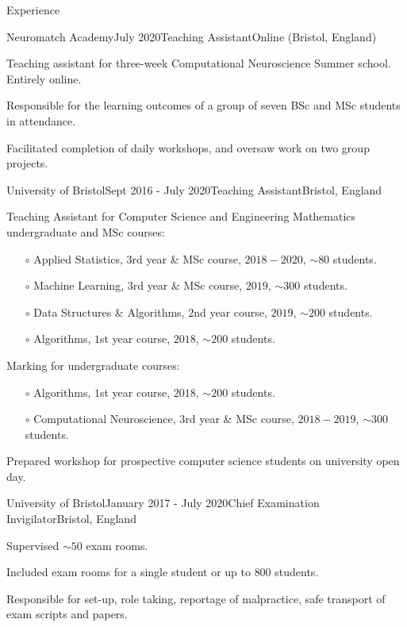 \documentclass{resume} %
\begin{document}
\begin{rSection}{Experience}

  \begin{rSubsection}{Neuromatch Academy}{July 2020}{Teaching Assistant}{Online (Bristol, England)}
    \item Teaching assistant for three-week Computational Neuroscience Summer school. Entirely online.
    \item Responsible for the learning outcomes of a group of seven BSc and MSc students in attendance.
    \item Facilitated completion of daily workshops, and oversaw work on two group projects.
  \end{rSubsection}

  \begin{rSubsection}{University of Bristol}{Sept 2016 - July 2020}{Teaching Assistant}{Bristol, England}
    \item Teaching Assistant for Computer Science and Engineering Mathematics undergraduate and MSc courses:
      \begin{itemize}
        \item[$\circ$] Applied Statistics, $3$rd year \&  MSc course, $2018 - 2020$, $\sim 80$ students.
        \item[$\circ$] Machine Learning, $3$rd year \& MSc course, $2019$, $\sim 300$ students.
        \item[$\circ$] Data Structures \& Algorithms, $2$nd year course, $2019$, $\sim 200$ students.
        \item[$\circ$] Algorithms, $1$st year course, $2018$, $\sim 200$ students.
      \end{itemize}\vspace{1.5mm}
    \item Marking for undergraduate courses:
      \begin{itemize}
        \item[$\circ$] Algorithms, $1$st year course, $2018$, $\sim 200$ students.
        \item[$\circ$] Computational Neuroscience, $3$rd year \& MSc course, $2018-2019$, $\sim 300$ students.
      \end{itemize}\vspace{1.5mm}
    \item Prepared workshop for prospective computer science students on university open day.
  \end{rSubsection}

  \begin{rSubsection}{University of Bristol}{January 2017 - July 2020}{Chief Examination Invigilator}{Bristol, England}
    \item Supervised $\sim 50$ exam rooms.
    \item Included exam rooms for a single student or up to $800$ students.
    \item Responsible for set-up, role taking, reportage of malpractice, safe transport of exam scripts and papers.
  \end{rSubsection}


\end{rSection}
\end{document}
